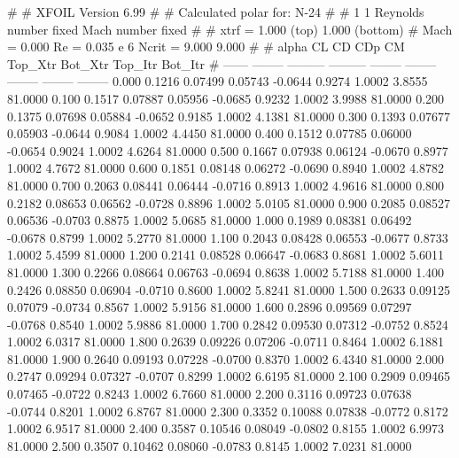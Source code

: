 #  
#       XFOIL         Version 6.99
#  
# Calculated polar for: N-24                                            
#  
# 1 1 Reynolds number fixed          Mach number fixed         
#  
# xtrf =   1.000 (top)        1.000 (bottom)  
# Mach =   0.000     Re =     0.035 e 6     Ncrit =   9.000  9.000
#  
#   alpha    CL        CD       CDp       CM     Top_Xtr  Bot_Xtr  Top_Itr  Bot_Itr
#  ------ -------- --------- --------- -------- -------- -------- -------- --------
   0.000   0.1216   0.07499   0.05743  -0.0644   0.9274   1.0002   3.8555  81.0000
   0.100   0.1517   0.07887   0.05956  -0.0685   0.9232   1.0002   3.9988  81.0000
   0.200   0.1375   0.07698   0.05884  -0.0652   0.9185   1.0002   4.1381  81.0000
   0.300   0.1393   0.07677   0.05903  -0.0644   0.9084   1.0002   4.4450  81.0000
   0.400   0.1512   0.07785   0.06000  -0.0654   0.9024   1.0002   4.6264  81.0000
   0.500   0.1667   0.07938   0.06124  -0.0670   0.8977   1.0002   4.7672  81.0000
   0.600   0.1851   0.08148   0.06272  -0.0690   0.8940   1.0002   4.8782  81.0000
   0.700   0.2063   0.08441   0.06444  -0.0716   0.8913   1.0002   4.9616  81.0000
   0.800   0.2182   0.08653   0.06562  -0.0728   0.8896   1.0002   5.0105  81.0000
   0.900   0.2085   0.08527   0.06536  -0.0703   0.8875   1.0002   5.0685  81.0000
   1.000   0.1989   0.08381   0.06492  -0.0678   0.8799   1.0002   5.2770  81.0000
   1.100   0.2043   0.08428   0.06553  -0.0677   0.8733   1.0002   5.4599  81.0000
   1.200   0.2141   0.08528   0.06647  -0.0683   0.8681   1.0002   5.6011  81.0000
   1.300   0.2266   0.08664   0.06763  -0.0694   0.8638   1.0002   5.7188  81.0000
   1.400   0.2426   0.08850   0.06904  -0.0710   0.8600   1.0002   5.8241  81.0000
   1.500   0.2633   0.09125   0.07079  -0.0734   0.8567   1.0002   5.9156  81.0000
   1.600   0.2896   0.09569   0.07297  -0.0768   0.8540   1.0002   5.9886  81.0000
   1.700   0.2842   0.09530   0.07312  -0.0752   0.8524   1.0002   6.0317  81.0000
   1.800   0.2639   0.09226   0.07206  -0.0711   0.8464   1.0002   6.1881  81.0000
   1.900   0.2640   0.09193   0.07228  -0.0700   0.8370   1.0002   6.4340  81.0000
   2.000   0.2747   0.09294   0.07327  -0.0707   0.8299   1.0002   6.6195  81.0000
   2.100   0.2909   0.09465   0.07465  -0.0722   0.8243   1.0002   6.7660  81.0000
   2.200   0.3116   0.09723   0.07638  -0.0744   0.8201   1.0002   6.8767  81.0000
   2.300   0.3352   0.10088   0.07838  -0.0772   0.8172   1.0002   6.9517  81.0000
   2.400   0.3587   0.10546   0.08049  -0.0802   0.8155   1.0002   6.9973  81.0000
   2.500   0.3507   0.10462   0.08060  -0.0783   0.8145   1.0002   7.0231  81.0000
